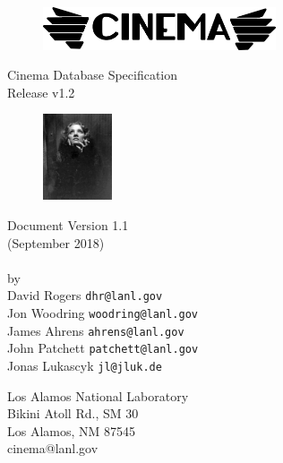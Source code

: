 \thispagestyle{empty}

\begin{ttfamily}
\begin{center}
 \ \ \\
\vspace{1.0 in}
\begin{figure}[h!]
\centering
\includegraphics[height=0.5in]{img/cinema_logo_name}
\end{figure}
\vspace{1.0 in}
Cinema Database Specification \\
\dietrich Release v1.2\\
\bigskip
\begin{figure}[h!]
\centering
\includegraphics[height=1.0in]{img/dietrich_spec_logo}
\end{figure}
\bigskip
Document Version 1.1 \\
(September 2018)\\
\LAUR\\
\bigskip
\bigskip
\bigskip
\bigskip
by \\
\bigskip
David Rogers   \texttt{\small dhr@lanl.gov}\\
Jon Woodring   \texttt{\small woodring@lanl.gov}\\
James Ahrens   \texttt{\small ahrens@lanl.gov}\\
John Patchett  \texttt{\small patchett@lanl.gov}\\
Jonas Lukascyk \texttt{\small jl@jluk.de}\\
\end{center}
\vspace{1.0 in}
\begin{flushright}
Los Alamos National Laboratory\\
Bikini Atoll Rd., SM 30\\
Los Alamos, NM 87545\\
cinema@lanl.gov\\
\end{flushright}
\end{ttfamily}
\newpage

\tableofcontents
\newpage

